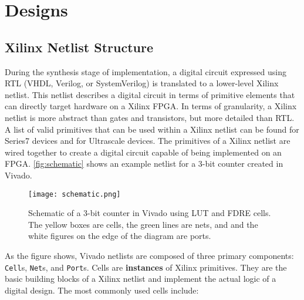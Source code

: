 \newpage
\section{Designs}
\graphicspath{{./techReportFigures/sec5_designs/}}

\subsection{Xilinx Netlist Structure} \label{sec:xilinxNetlist}
During the synthesis stage of implementation, a digital circuit expressed using
RTL (VHDL, Verilog, or SystemVerilog) is translated to a lower-level Xilinx
netlist. This netlist describes a digital circuit in terms of primitive elements
that can directly target hardware on a Xilinx FPGA. In terms of granularity, a
Xilinx netlist is more abstract than gates and transistors, but more detailed
than RTL. A list of valid primitives that can be used within a Xilinx netlist
can be found
\href{http://www.xilinx.com/support/documentation/sw_manuals/xilinx2016_2/ug953-vivado-7series-libraries.pdf}{\color{blue}{here}}
for Series7 devices and
\href{http://www.xilinx.com/support/documentation/sw_manuals/xilinx2014_1/ug974-vivado-ultrascale-libraries.pdf}{\color{blue}{here}}
for Ultrascale devices. The primitives of a Xilinx netlist are wired together to
create a digital circuit capable of being implemented on an FPGA.
\autoref{fig:schematic} shows an example netlist for a 3-bit counter created in Vivado.

\begin{figure}[h!]
 \centering
 \texttt{[image: schematic.png]}
 \caption{Schematic of a 3-bit counter in Vivado using LUT and FDRE cells.
 The yellow boxes are cells, the green lines are nets, and and the
 white figures on the edge of the diagram are ports.}
 \label{fig:schematic}
\end{figure}

As the figure shows, Vivado netlists are composed of three primary components:
\texttt{Cell}s, \texttt{Net}s, and \texttt{Port}s. Cells are \textbf{instances} of
Xilinx primitives. They are the basic building blocks of a Xilinx netlist and
implement the actual logic of a digital design. The most commonly used
cells include:

